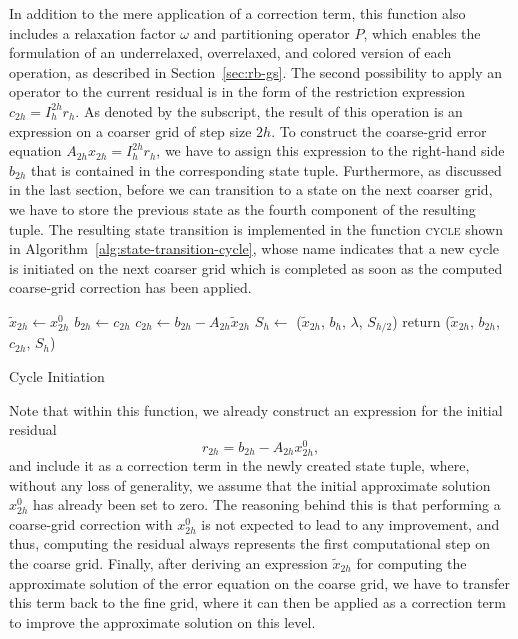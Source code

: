 In addition to the mere application of a correction term, this function also includes a relaxation factor $\omega$ and partitioning operator $P$, which enables the formulation of an underrelaxed, overrelaxed, and colored version of each operation, as described in Section~\ref{sec:rb-gs}.
The second possibility to apply an operator to the current residual is in the form of the restriction expression $c_{2h} = I_{h}^{2h} r_h$.
As denoted by the subscript, the result of this operation is an expression on a coarser grid of step size $2h$.
To construct the coarse-grid error equation $A_{2h} x_{2h} = I_{h}^{2h} r_h$, we have to assign this expression to the right-hand side $b_{2h}$ that is contained in the corresponding state tuple.
Furthermore, as discussed in the last section, before we can transition to a state on the next coarser grid, we have to store the previous state as the fourth component of the resulting tuple.
The resulting state transition is implemented in the function \textsc{cycle} shown in Algorithm~\ref{alg:state-transition-cycle}, whose name indicates that a new cycle is initiated on the next coarser grid which is completed as soon as the computed coarse-grid correction has been applied.
\begin{algorithm}
	\begin{algorithmic}
		\State $\tilde{x}_{2h} \gets x_{2h}^0$ 
		\State $b_{2h} \gets c_{2h}$
		\State $c_{2h} \gets b_{2h} - A_{2h} \tilde{x}_{2h}$ 
		\State $S_h \gets$ ($\tilde{x}_{2h}$, $b_{h}$, $\lambda$, $S_{h/2}$)
		\State return ($\tilde{x}_{2h}$, $b_{2h}$, $c_{2h}$, $S_h$)
	\EndFunction
	\end{algorithmic}
 \caption{Cycle Initiation}
\label{alg:state-transition-cycle}
\end{algorithm}
Note that within this function, we already construct an expression for the initial residual
\begin{equation}
	r_{2h} = b_{2h} - A_{2h} x_{2h}^0,
\end{equation} 
and include it as a correction term in the newly created state tuple, where, without any loss of generality, we assume that the initial approximate solution $x^0_{2h}$ has already been set to zero.
The reasoning behind this is that performing a coarse-grid correction with $x^0_{2h}$ is not expected to lead to any improvement, and thus, computing the residual always represents the first computational step on the coarse grid.
Finally, after deriving an expression $\tilde{x}_{2h}$ for computing the approximate solution of the error equation on the coarse grid, we have to transfer this term back to the fine grid, where it can then be applied as a correction term to improve the approximate solution on this level.
